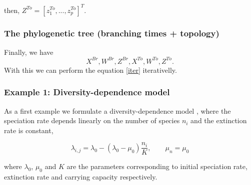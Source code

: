 	
then, $Z^{To} = [z_1^{To},...,z_p^{To}]^T$.


 \subsubsection*{The phylogenetic tree (branching times + topology)}
 
 Finally, we have $$X^{Br}, W^{Br}, Z^{Br}, X^{To}, W^{To}, Z^{To}.$$ With this we can perform the equation \ref{iter} iterativelly.
 
 




\subsubsection{Example 1: Diversity-dependence model }

As a first example we formulate a diversity-dependence model \cite{etienne2011diversity}, where the speciation rate depends linearly on the number of species $n_i$ and the extinction rate is constant, 

$$ \lambda_{i,j} = \lambda_0 - (\lambda_0 - \mu_0)\frac{n_i}{K}, \qquad \mu_n = \mu_0 $$ 


where $\lambda_0$, $\mu_0$ and $K$ are the parameters corresponding to initial speciation rate, extinction rate and carrying capacity respectively. \\

